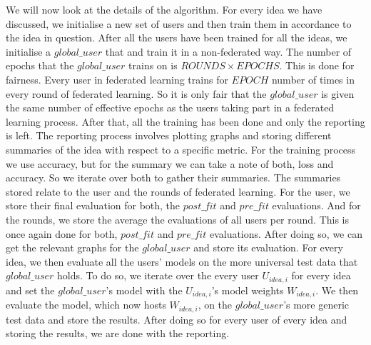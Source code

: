 \documentclass[12pt]{article}
\begin{document}
We will now look at the details of the algorithm. For every idea we have discussed, we initialise a new set of users and then train them in accordance to the idea in question. After all the users have been trained for all the ideas, we initialise a $global\_user$ that and train it in a non-federated way. The number of epochs that the $global\_user$ trains on is $ROUNDS \times EPOCHS$. This is done for fairness. Every user in federated learning trains for $EPOCH$ number of times in every round of federated learning. So it is only fair that the $global\_user$ is given the same number of effective epochs as the users taking part in a federated learning process. After that, all the training has been done and only the reporting is left. The reporting process involves plotting graphs and storing different summaries of the idea with respect to a specific metric. For the training process we use accuracy, but for the summary we can take a note of both, loss and accuracy. So we iterate over both to gather their summaries. The summaries stored relate to the user and the rounds of federated learning. For the user, we store their final evaluation for both, the $post\_fit$ and $pre\_fit$ evaluations. And for the rounds, we store the average the evaluations of all users per round. This is once again done for both, $post\_fit$ and $pre\_fit$ evaluations. After doing so, we can get the relevant graphs for the $global\_user$ and store its evaluation. For every idea, we then evaluate all the users' models on the more universal test data that $global\_user$ holds. To do so, we iterate over the every user $U_{idea, i}$ for every idea and set the $global\_user$'s model with the $U_{idea, i}$'s model weights $W_{idea, i}$. We then evaluate the model, which now hosts $W_{idea, i}$, on the $global\_user$'s more generic test data and store the results. After doing so for every user of every idea and storing the results, we are done with the reporting. 
\end{document}
